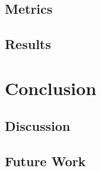 \documentclass[UKenglish, a4paper]{ifimaster}
\begin{document}
    \chapter{Metrics}
    
    \chapter{Results}


\part{Conclusion}
    \chapter{Discussion}
    \chapter{Future Work}


\backmatter{}
\printbibliography{}
\end{document}
